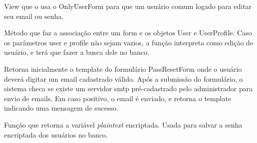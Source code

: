 \documentclass[letterpaper,10pt,brazil]{sphinxmanual}
\begin{document}

\begin{fulllineitems}
\label{apps/accounts:accounts.views.edit_self}
View que o usa o OnlyUserForm para que um usuário comum logado para editar seu email ou senha.

\end{fulllineitems}


\begin{fulllineitems}
\label{apps/accounts:accounts.views.save_or_update}
Método que faz a associação entre um form e os objetos User e UserProfile. Caso os parâmetros user e profile não sejam vazios, a função interpreta como edição de usuário, e terá que fazer a busca dele no banco.

\end{fulllineitems}


\begin{fulllineitems}
\label{apps/accounts:accounts.views.password_reset}
Retorna inicialmente o template do formulário PassResetForm onde o usuário deverá digitar um email cadastrado válido. Após a submissão do formulário, o sistema checa se existe um servidor smtp pré-cadastrado pelo administrador para envio de emails. Em caso positivo, o email é enviado, e retorna o template indicando uma mensagem de sucesso.

\end{fulllineitems}


\begin{fulllineitems}
\label{apps/accounts:accounts.views.encrypt}
Função que retorna a variável \emph{plaintext} encriptada. Usada para salvar a senha encriptada dos usuários no banco.

\end{fulllineitems}

\end{document}
